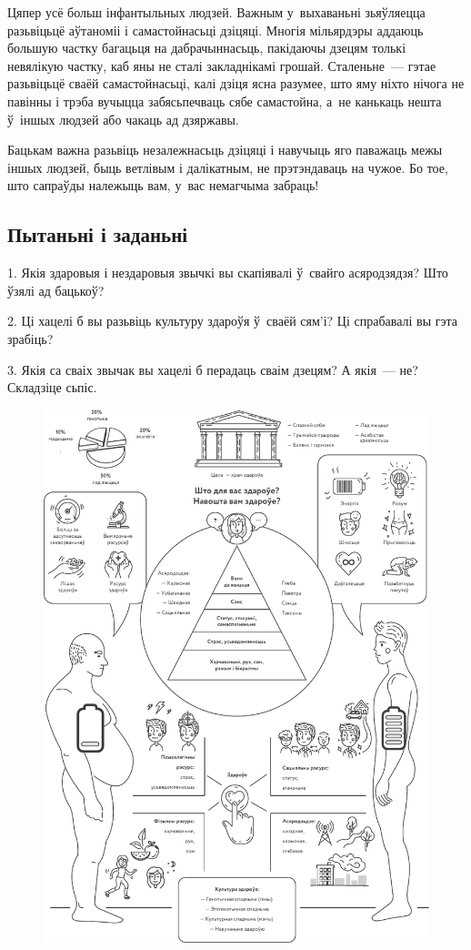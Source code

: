 Цяпер усё больш інфантыльных людзей. Важным у~выхаваньні зьяўляецца разьвіцьцё аўтаноміі і самастойнасьці дзіцяці. Многія мільярдэры аддаюць большую частку багацьця на дабрачыннасьць, пакідаючы дзецям толькі невялікую частку, каб яны не сталі закладнікамі грошай. Сталеньне~--- гэтае разьвіцьцё сваёй самастойнасьці, калі дзіця ясна разумее, што яму ніхто нічога не павінны і трэба вучыцца забясьпечваць сябе самастойна, а~не канькаць нешта ў~іншых людзей або чакаць ад дзяржавы.

Бацькам важна разьвіць незалежнасьць дзіцяці і навучыць яго паважаць межы іншых людзей, быць ветлівым і далікатным, не прэтэндаваць на чужое. Бо тое, што сапраўды належыць вам, у~вас немагчыма забраць!

\subsection*{Пытаньні і заданьні}

1. Якія здаровыя і нездаровыя звычкі вы скапіявалі ў~свайго асяродзядзя? Што ўзялі ад бацькоў?

2. Ці хацелі б вы разьвіць культуру здароўя ў~сваёй сям'і? Ці спрабавалі вы гэта зрабіць?

3. Якія са сваіх звычак вы хацелі б перадаць сваім дзецям? А якія~--- не? Складзіце сьпіс.

\clearpage
\thispagestyle{empty}
\begin{figure}[htb!]
  \vspace*{-0.25in}
  \includegraphics[width=\textwidth]{willpower/ch1/full.pdf}  
\end{figure}
